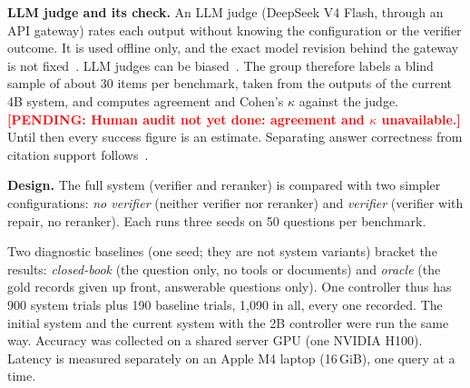 \documentclass[a4paper,11pt]{article}
\newcommand{\hdr}[1]{\par\vspace{1.5pt}\noindent\textbf{#1}}
\newcommand{\pending}[1]{\textcolor{red}{\textbf{[PENDING: #1]}}}
\begin{document}
\hdr{LLM judge and its check.} An LLM judge (DeepSeek V4 Flash, through an API gateway) rates each output without knowing the configuration or the verifier outcome. It is used offline only, and the exact model revision behind the gateway is not fixed~\citep{deepseek2026api}. LLM judges can be biased~\citep{zheng2023judge}. The group therefore labels a blind sample of about 30 items per benchmark, taken from the outputs of the current 4B system, and computes agreement and Cohen's $\kappa$ against the judge. \pending{Human audit not yet done: agreement and $\kappa$ unavailable.} Until then every success figure is an estimate. Separating answer correctness from citation support follows~\citet{gao2023alce}.

\hdr{Design.} The full system (verifier and reranker) is compared with two simpler configurations: \emph{no verifier} (neither verifier nor reranker) and \emph{verifier} (verifier with repair, no reranker). Each runs three seeds on 50 questions per benchmark.

Two diagnostic baselines (one seed; they are not system variants) bracket the results: \emph{closed-book} (the question only, no tools or documents) and \emph{oracle} (the gold records given up front, answerable questions only). One controller thus has 900 system trials plus 190 baseline trials, 1{,}090 in all, every one recorded. The initial system and the current system with the 2B controller were run the same way. Accuracy was collected on a shared server GPU (one NVIDIA H100). Latency is measured separately on an Apple M4 laptop (16\,GiB), one query at a time.
\end{document}
